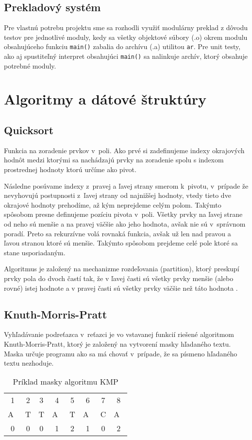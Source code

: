 \documentclass[12pt,a4paper,titlepage,final]{article}
\begin{document}
\subsection{Prekladový systém}
Pre vlastnú potrebu projektu sme sa rozhodli využiť modulárny preklad
z dôvodu testov pre jednotlivé moduly, kedy sa všetky objektové súbory (.o)
okrem modulu obsahujúceho funkciu \texttt{main()} zabalia do archívu (.a)
utilitou \texttt{ar}. Pre unit testy, ako aj spustiteľný interpret
obsahujúci \texttt{main()} sa nalinkuje archív, ktorý obsahuje potrebné moduly.

\section{Algoritmy a dátové štruktúry}
\subsection{Quicksort}
Funkcia na zoradenie prvkov v~poli. Ako prvé si zadefinujeme indexy okrajových
hodnôt medzi ktorými sa nachádzajú prvky na zoradenie spolu s indexom
prostrednej hodnoty ktorú určíme ako pivot.

Následne posúvame indexy z~pravej a ľavej strany smerom k~pivotu,
 v~prípade že nevyhovujú postupnosti z~ľavej strany od najnižšej hodnoty, 
 vtedy tieto dve okrajové hodnoty prehodíme, až kým neprejdeme celým polom.
Takýmto spôsobom presne definujeme pozíciu pivota v~poli. Všetky prvky na ľavej
 strane od neho sú menšie a na pravej väčšie ako jeho hodnota, avšak nie sú
 v~správnom poradí. Preto sa rekurzívne volá rovnaká funkcia, avšak už len nad
 pravou a ľavou stranou ktoré sú menšie. Takýmto spôsobom prejdeme celé pole
 ktoré sa stane usporiadaným.

Algoritmus je založený na mechanizme rozdeľovania (partition), ktorý preskupí
prvky pola do dvoch častí tak, že v ľavej časti sú všetky prvky menšie 
(alebo rovné) istej hodnote a v pravej časti sú všetky prvky väčšie než táto 
hodnota \cite{honzik}.

\subsection{Knuth-Morris-Pratt}
Vyhľadávanie podreťazca v~reťazci je vo vstavanej funkcií riešené algoritmom
 Knuth-Morris-Pratt, ktorý je založený na vytvorení masky hľadaného textu.
Maska určuje programu ako sa má chovať v~prípade, že sa písmeno hľadaného
 textu nezhoduje.
\begin{table}[H]
 \centering
 \begin{tabular}{cccccccc}
 	1 & 2 & 3 & 4 & 5 & 6 & 7 & 8 \\
 	A~& T & T & A~& T & A~& C & A~\\
 	0 & 0 & 0 & 1 & 2 & 1 & 0 & 2
 \end{tabular}
 \caption{Príklad masky algoritmu KMP}
 \label{tab:kmp}
\end{table}
\end{document}
